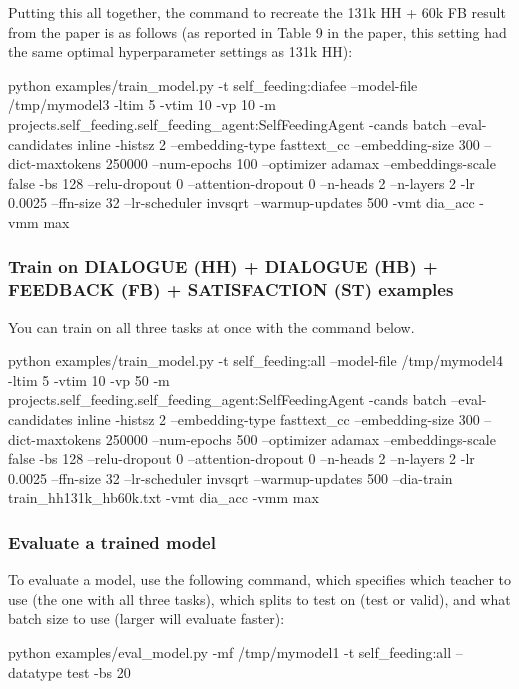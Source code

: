 Putting this all together, the command to recreate the 131k HH + 60k FB result from the paper is as follows (as reported in Table 9 in the paper, this setting had the same optimal hyperparameter settings as 131k HH)\+:


\begin{DoxyCode}
python examples/train\_model.py -t self\_feeding:diafee --model-file /tmp/mymodel3 -ltim 5 -vtim 10 -vp 10 -m
       projects.self\_feeding.self\_feeding\_agent:SelfFeedingAgent -cands batch --eval-candidates inline -histsz 2
       --embedding-type fasttext\_cc --embedding-size 300 --dict-maxtokens 250000 --num-epochs 100 --optimizer adamax
       --embeddings-scale false -bs 128 --relu-dropout 0 --attention-dropout 0 --n-heads 2 --n-layers 2 -lr 0.0025
       --ffn-size 32 --lr-scheduler invsqrt --warmup-updates 500 -vmt dia\_acc -vmm max
\end{DoxyCode}


\subsubsection*{Train on D\+I\+A\+L\+O\+G\+UE (HH) + D\+I\+A\+L\+O\+G\+UE (HB) + F\+E\+E\+D\+B\+A\+CK (FB) + S\+A\+T\+I\+S\+F\+A\+C\+T\+I\+ON (ST) examples}

You can train on all three tasks at once with the command below. 
\begin{DoxyCode}
python examples/train\_model.py -t self\_feeding:all --model-file /tmp/mymodel4 -ltim 5 -vtim 10 -vp 50 -m
       projects.self\_feeding.self\_feeding\_agent:SelfFeedingAgent -cands batch --eval-candidates inline -histsz 2
       --embedding-type fasttext\_cc --embedding-size 300 --dict-maxtokens 250000 --num-epochs 500 --optimizer adamax
       --embeddings-scale false -bs 128 --relu-dropout 0 --attention-dropout 0 --n-heads 2 --n-layers 2 -lr 0.0025
       --ffn-size 32 --lr-scheduler invsqrt --warmup-updates 500 --dia-train train\_hh131k\_hb60k.txt -vmt dia\_acc -vmm
       max
\end{DoxyCode}


\subsubsection*{Evaluate a trained model}

To evaluate a model, use the following command, which specifies which teacher to use (the one with all three tasks), which splits to test on ({\ttfamily test} or {\ttfamily valid}), and what batch size to use (larger will evaluate faster)\+: 
\begin{DoxyCode}
python examples/eval\_model.py -mf /tmp/mymodel1 -t self\_feeding:all --datatype test -bs 20
\end{DoxyCode}


